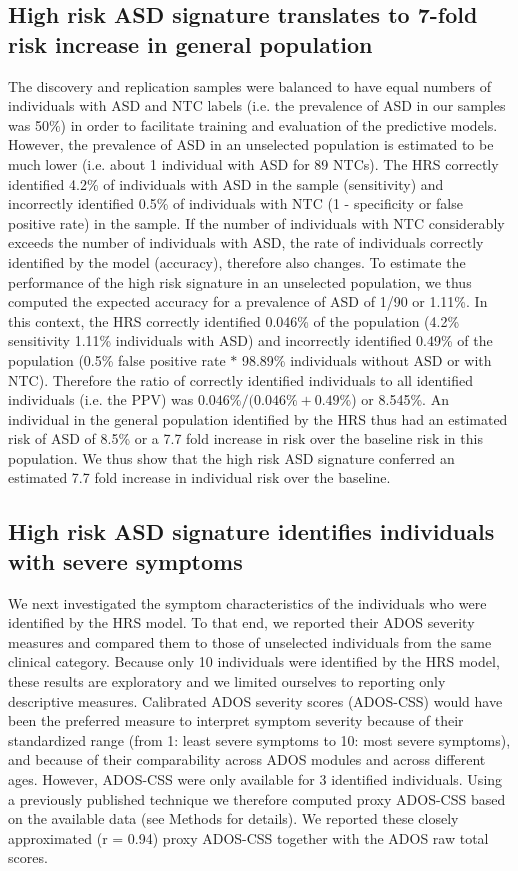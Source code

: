\documentclass[9pt,lineno]{elife}
\begin{document}
\subsection{High risk ASD signature translates to 7-fold risk increase in general population}
The discovery and replication samples were balanced to have equal numbers of individuals with ASD and NTC labels (i.e. the prevalence of ASD in our samples was 50\%) in order to facilitate training and evaluation of the predictive models. However, the prevalence of ASD in an unselected population is estimated to be much lower (i.e. about 1 individual with ASD for 89 NTCs). The HRS correctly identified 4.2\% of individuals with ASD in the sample (sensitivity) and incorrectly identified 0.5\% of individuals with NTC (1 - specificity or false positive rate) in the sample. If the number of individuals with NTC considerably exceeds the number of individuals with ASD, the rate of individuals correctly identified by the model (accuracy), therefore also changes. To estimate the performance of the high risk signature in an unselected population, we thus computed the expected accuracy for a prevalence of ASD of 1/90 or 1.11\%. In this context, the HRS correctly identified 0.046\% of the population (4.2\% sensitivity  1.11\% individuals with ASD) and incorrectly identified 0.49\% of the population (0.5\% false positive rate $*$ 98.89\% individuals without ASD or with NTC). Therefore the ratio of correctly identified individuals to all identified individuals (i.e. the PPV) was $0.046\% / (0.046\% + 0.49\%$) or 8.545\%. An individual in the general population identified by the HRS thus had an estimated risk of ASD of 8.5\% or a 7.7 fold increase in risk over the baseline risk in this population. We thus show that the high risk ASD signature conferred an estimated 7.7 fold increase in individual risk over the baseline.

\subsection{High risk ASD signature identifies individuals with severe symptoms}
We next investigated the symptom characteristics of the individuals who were identified by the HRS model. To that end, we reported their ADOS severity measures and compared them to those of unselected individuals from the same clinical category. Because only 10 individuals were identified by the HRS model, these results are exploratory and we limited ourselves to reporting only descriptive measures. Calibrated ADOS severity scores (ADOS-CSS) would have been the preferred measure to interpret symptom severity because of their standardized range (from 1: least severe symptoms to 10: most severe symptoms), and because of their comparability across ADOS modules and across different ages. However, ADOS-CSS were only available for 3 identified individuals. Using a previously published technique we therefore computed proxy ADOS-CSS based on the available data (see Methods for details). We reported these closely approximated (r = 0.94) proxy ADOS-CSS together with the ADOS raw total scores.
\end{document}
